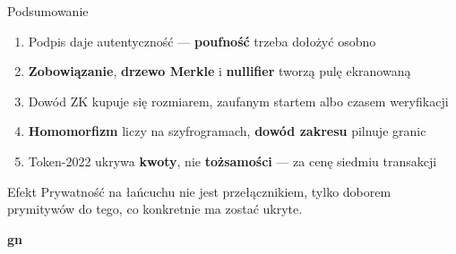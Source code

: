 \begin{frame}{Podsumowanie}
  \begin{enumerate}
    \item Podpis daje autentyczność --- \textbf{poufność} trzeba dołożyć osobno
    \item \textbf{Zobowiązanie}, \textbf{drzewo Merkle} i \textbf{nullifier} tworzą pulę ekranowaną
    \item Dowód ZK kupuje się rozmiarem, zaufanym startem albo czasem weryfikacji
    \item \textbf{Homomorfizm} liczy na szyfrogramach, \textbf{dowód zakresu} pilnuje granic
    \item Token-2022 ukrywa \textbf{kwoty}, nie \textbf{tożsamości} --- za cenę siedmiu transakcji
  \end{enumerate}
  \vspace{0.2cm}
  \begin{exampleblock}{Efekt}
    Prywatność na łańcuchu nie jest przełącznikiem, tylko doborem prymitywów
    do tego, co konkretnie ma zostać ukryte.
  \end{exampleblock}
\end{frame}

\begin{frame}[plain]
  \begin{center}
    \vfill
    {\Huge\bfseries\color{stplwhite} gn}
    \vfill
  \end{center}
\end{frame}


